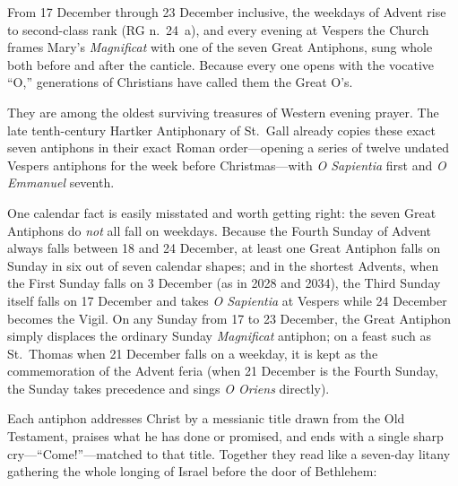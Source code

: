 From 17 December through 23 December inclusive, the weekdays of Advent rise to
second-class rank (RG n.~24~a), and every evening at Vespers the Church frames
Mary's \textit{Magnificat} with one of the seven Great Antiphons, sung whole
both before and after the canticle. Because every one opens with the vocative
``O,'' generations of Christians have called them the Great O's.

They are among the oldest surviving treasures of Western evening prayer. The
late tenth-century Hartker Antiphonary of St.~Gall already copies these exact
seven antiphons in their exact Roman order---opening a series of twelve undated
Vespers antiphons for the week before Christmas---with \textit{O Sapientia}
first and \textit{O Emmanuel} seventh.

One calendar fact is easily misstated and worth getting right: the seven Great
Antiphons do \textit{not} all fall on weekdays. Because the Fourth Sunday of
Advent always falls between 18 and 24 December, at least one Great Antiphon
falls on Sunday in six out of seven calendar shapes; and in the shortest
Advents, when the First Sunday falls on 3 December (as in 2028 and 2034), the
Third Sunday itself falls on 17 December and takes \textit{O Sapientia} at
Vespers while 24 December becomes the Vigil. On any Sunday from 17 to 23
December, the Great Antiphon simply displaces the ordinary Sunday
\textit{Magnificat} antiphon; on a feast such as St.~Thomas when 21 December
falls on a weekday, it is kept as the commemoration of the Advent feria (when
21 December is the Fourth Sunday, the Sunday takes precedence and sings
\textit{O Oriens} directly).

Each antiphon addresses Christ by a messianic title drawn from the Old
Testament, praises what he has done or promised, and ends with a single sharp
cry---``Come!''---matched to that title. Together they read like a seven-day
litany gathering the whole longing of Israel before the door of Bethlehem:

